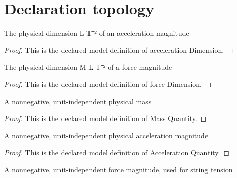 \section{Declaration topology}
\begin{definition}
  \label{def:physics:phyx-mini-0805:phyxminiproblems-problemphyxmini0805-accelerationdimension}
  The physical dimension L T⁻² of an acceleration magnitude
\end{definition}
\begin{proof}
  This is the declared model definition of acceleration Dimension.
\end{proof}
\begin{definition}
  \label{def:physics:phyx-mini-0805:phyxminiproblems-problemphyxmini0805-forcedimension}
  The physical dimension M L T⁻² of a force magnitude
\end{definition}
\begin{proof}
  This is the declared model definition of force Dimension.
\end{proof}
\begin{definition}
  \label{def:physics:phyx-mini-0805:phyxminiproblems-problemphyxmini0805-massquantity}
  A nonnegative, unit-independent physical mass
\end{definition}
\begin{proof}
  This is the declared model definition of Mass Quantity.
\end{proof}
\begin{definition}
  \label{def:physics:phyx-mini-0805:phyxminiproblems-problemphyxmini0805-accelerationquantity}
  A nonnegative, unit-independent physical acceleration magnitude
\end{definition}
\begin{proof}
  This is the declared model definition of Acceleration Quantity.
\end{proof}
\begin{definition}
  \label{def:physics:phyx-mini-0805:phyxminiproblems-problemphyxmini0805-tensionquantity}
  A nonnegative, unit-independent force magnitude, used for string tension
\end{definition}
